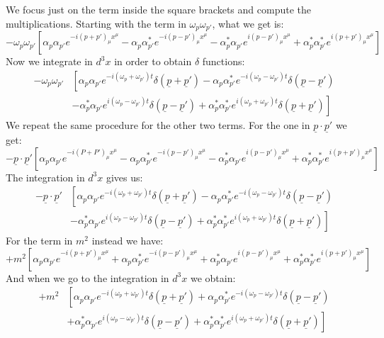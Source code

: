 \documentclass[../main.tex]{subfiles}
\begin{document}
We focus just on the term inside the square brackets and compute the multiplications. Starting with the term in $\omega_p\omega_{p'}$, what we get is:
\[
-\omega_p\omega_{p'}\left[\alpha_p\alpha_{p'}e^{-i(p+p')_\mu x^\mu}-\alpha_p\alpha_{p'}^*e^{-i(p-p')_\mu x^\mu}-\alpha_p^*\alpha_{p'}e^{i(p-p')_\mu x^\mu}+\alpha_p^*\alpha_{p'}^*e^{i(p+p')_\mu x^\mu}\right]
\]
Now we integrate in $d^3x$ in order to obtain $\delta$ functions:
\begin{align*}
-\omega_p\omega_{p'}&\left[\alpha_p\alpha_{p'}e^{-i(\omega_p+\omega_{p'})t}\delta(\underline{p}+\underline{p}')-\alpha_p\alpha_{p'}^*e^{-i(\omega_p-\omega_{p'})t}\delta(\underline{p}-\underline{p}')\right.\\
&\left.-\alpha_p^*\alpha_{p'}e^{i(\omega_p-\omega_{p'})t}\delta(\underline{p}-\underline{p}')+\alpha_p^*\alpha_{p'}^*e^{i(\omega_p+\omega_{p'})t}\delta(\underline{p}+\underline{p}')\right]
\end{align*}
We repeat the same procedure for the other two terms. For the one in $\underline{p}\cdot\underline{p}'$ we get:
\[
-\underline{p}\cdot\underline{p}'\left[\alpha_p\alpha_{p'}e^{-i(P+P')_\mu x^\mu}-\alpha_p\alpha_{p'}^*e^{-i(p-p')_\mu x^\mu}-\alpha_p^*\alpha_{p'}e^{i(p-p')_\mu x^\mu}+\alpha_p^*\alpha_{p'}^*e^{i(p+p')_\mu x^\mu}\right]
\]
The integration in $d^3x$ gives us:
\begin{align*}
-\underline{p}\cdot\underline{p}'&\left[\alpha_p\alpha_{p'}e^{-i(\omega_p+\omega_{p'})t}\delta(\underline{p}+\underline{p}')-\alpha_p\alpha_{p'}^*e^{-i(\omega_p-\omega_{p'})t}\delta(\underline{p}-\underline{p}')\right.\\
&\left.-\alpha_p^*\alpha_{p'}e^{i(\omega_p-\omega_{p'})t}\delta(\underline{p}-\underline{p}')+\alpha_p^*\alpha_{p'}^*e^{i(\omega_p+\omega_{p'})t}\delta(\underline{p}+\underline{p}')\right]
\end{align*}
For the term in $m^2$ instead we have:
\[
+m^2\left[\alpha_p\alpha_{p'}e^{-i(p+p')_\mu x^\mu}+\alpha_p\alpha_{p'}^*e^{-i(p-p')_\mu x^\mu}+\alpha_p^*\alpha_{p'}e^{i(p-p')_\mu x^\mu}+\alpha_p^*\alpha_{p'}^*e^{i(p+p')_\mu x^\mu}\right]\
\]
And when we go to the integration in $d^3x$ we obtain:
\begin{align*}
+m^2&\left[\alpha_p\alpha_{p'}e^{-i(\omega_p+\omega_{p'})t}\delta(\underline{p}+\underline{p}')+\alpha_p\alpha_{p'}^*e^{-i(\omega_p-\omega_{p'})t}\delta(\underline{p}-\underline{p}')\right.\\
&\left.+\alpha_p^*\alpha_{p'}e^{i(\omega_p-\omega_{p'})t}\delta(\underline{p}-\underline{p}')+\alpha_p^*\alpha_{p'}^*e^{i(\omega_p+\omega_{p'})t}\delta(\underline{p}+\underline{p}')\right]
\end{align*}
\end{document}
